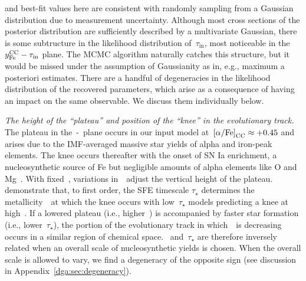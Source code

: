 and best-fit values here are consistent with randomly sampling from a Gaussian
distribution due to measurement uncertainty.
Although most cross sections of the posterior distribution are sufficiently
described by a multivariate Gaussian, there is some subtructure in the
likelihood distribution of~$\tau_\text{in}$, most noticeable in the
$y_\text{Fe}^\text{CC} - \tau_\text{in}$ plane.
The MCMC algorithm naturally catches this structure, but it would be missed
under the assumption of Gaussianity as in, e.g., maximum a posteriori estimates.
There are a handful of degeneracies in the likelihood distribution of the
recovered parameters, which arise as a consequence of having an impact on the
same observable.
We discuss them individually below.
\par
\textit{The height of the ``plateau'' and position of the ``knee'' in the
evolutionary track.}
The plateau in the~\afe-\feh~plane occurs in our input model
at~$\text{[$\alpha$/Fe]}_\text{CC} \approx +0.45$ and arises due to the IMF-averaged massive
star yields of alpha and iron-peak elements.
The knee occurs thereafter with the onset of SN Ia enrichment, a
nucleosynthetic source of Fe but negligible amounts of alpha elements like O
and Mg~\citep{Johnson2019}.
With fixed~\yacc, variations in~\yfecc~adjust the vertical height of the
plateau.
\citet{Weinberg2017b} demonstrate that, to first order, the SFE timescale
$\tau_\star$ determines the metallicity~\feh~at which the knee occurs with
low~$\tau_\star$ models predicting a knee at high~\feh.
If a lowered plateau (i.e., higher~\yfecc) is accompanied by faster star
formation (i.e., lower~$\tau_\star$), the portion of the evolutionary track
in which~\afe~is decreasing occurs in a similar region of chemical space.
\yfecc~and~$\tau_\star$ are therefore inversely related when an overall scale
of nucleosynthetic yields is chosen.
When the overall scale is allowed to vary, we find a degeneracy of the opposite
sign (see discussion in Appendix~\ref{dga:sec:degeneracy}).
\par
